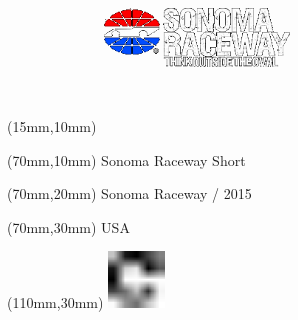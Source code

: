 \null\newpage
\begin{textblock*}{50mm}(15mm,10mm)%
\includegraphics[width=50mm]{LG/SON.png}
\end{textblock*}
\begin{textblock*}{130mm}(70mm,10mm)%
{\fontsize{20}{20}\selectfont Sonoma Raceway Short}\\
\end{textblock*}
\begin{textblock*}{120mm}(70mm,20mm)%
{\fontsize{16}{16}\selectfont Sonoma Raceway / 2015}\\
\end{textblock*}
\begin{textblock*}{120mm}(70mm,30mm)%
{\fontsize{12}{12}\selectfont USA}
\end{textblock*}
\begin{textblock*}{30mm}(110mm,30mm)%
\centering
\includegraphics[height=15mm]{icons/fa-rotate-right.pdf}
\end{textblock*}
